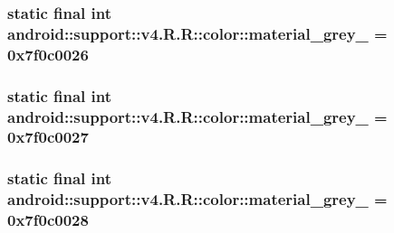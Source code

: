 \hypertarget{classandroid_1_1support_1_1v4_1_1_r_1_1color_e1b172850c18ccaf00a2b97ee2a585e2}{
\subsubsection[{material\_\-grey\_\-50}]{\setlength{\rightskip}{0pt plus 5cm}static final int android::support::v4.R.R::color::material\_\-grey\_ = 0x7f0c0026}}
\label{classandroid_1_1support_1_1v4_1_1_r_1_1color_e1b172850c18ccaf00a2b97ee2a585e2}


\hypertarget{classandroid_1_1support_1_1v4_1_1_r_1_1color_bb1c48cfec63055b48ca69c6fc5a3815}{
\subsubsection[{material\_\-grey\_\-600}]{\setlength{\rightskip}{0pt plus 5cm}static final int android::support::v4.R.R::color::material\_\-grey\_ = 0x7f0c0027}}
\label{classandroid_1_1support_1_1v4_1_1_r_1_1color_bb1c48cfec63055b48ca69c6fc5a3815}


\hypertarget{classandroid_1_1support_1_1v4_1_1_r_1_1color_a338d4ee2ab9cebbc9d4af8945e2703a}{
\subsubsection[{material\_\-grey\_\-800}]{\setlength{\rightskip}{0pt plus 5cm}static final int android::support::v4.R.R::color::material\_\-grey\_ = 0x7f0c0028}}
\label{classandroid_1_1support_1_1v4_1_1_r_1_1color_a338d4ee2ab9cebbc9d4af8945e2703a}


